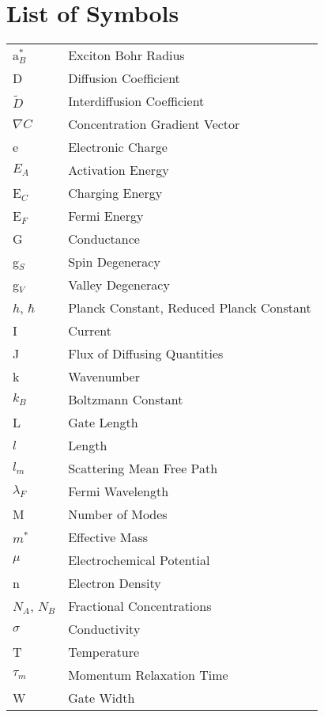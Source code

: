 
\chapter*{List of Symbols}
\label{sec:ListOfSymbols}

\begin{tabular}{l l}

a$_B^*$ & Exciton Bohr Radius \\ 
D & Diffusion Coefficient \\
$\tilde{D}$ & Interdiffusion Coefficient \\
$\nabla{C}$ & Concentration Gradient Vector \\
e & Electronic Charge \\
$E_A$ & Activation Energy \\
E$_C$ & Charging Energy \\
E$_F$ & Fermi Energy \\
G & Conductance \\
g$_S$ & Spin Degeneracy \\
g$_V$ &  Valley Degeneracy \\
$h$, $\hbar$ & Planck Constant,  Reduced Planck Constant \\
I & Current \\
J & Flux of Diffusing Quantities \\
k & Wavenumber \\
$k_B$ & Boltzmann Constant \\
L & Gate Length \\
$l$ & Length \\
$l_m$ & Scattering Mean Free Path \\
$\lambda_F$ & Fermi Wavelength \\
M & Number of Modes \\
$m^*$ & Effective Mass \\
$\mu$ & Electrochemical Potential \\
n & Electron Density \\
$N_A$, $N_B$ & Fractional Concentrations \\
$\sigma$ & Conductivity \\
T & Temperature \\
$\tau_m$ & Momentum Relaxation Time\\
W & Gate Width \\

\end{tabular}

